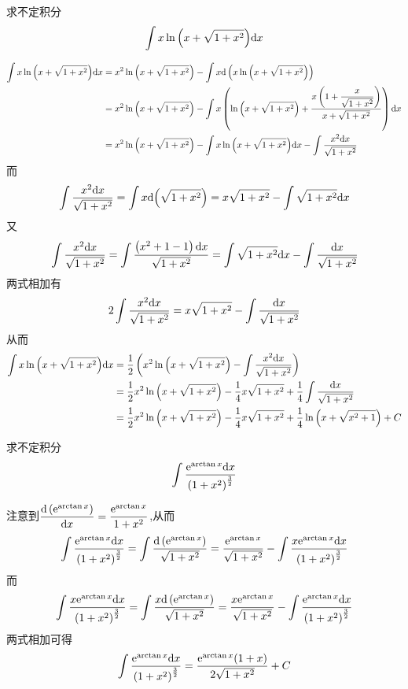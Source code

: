 \documentclass{ctexart}
\begin{document}
\begin{problem}[Problem 5.]
    求不定积分$$\int{x\ln{\left(x+\sqrt{1+x^2}\right)}}\mathrm{d} x$$ 
\end{problem}
\begin{solution}[Solution.]
    $$\begin{aligned}
        \int{x\ln{\left(x+\sqrt{1+x^2}\right)}}\mathrm{d} x
        &= x^2\ln{\left(x+\sqrt{1+x^2}\right)}-\int{x\mathrm{d}\left(x\ln{\left(x+\sqrt{1+x^2}\right)}\right)} \\
        &= x^2\ln{\left(x+\sqrt{1+x^2}\right)}-\int{x\left(\ln{\left(x+\sqrt{1+x^2}\right)}+\dfrac{x\left(1+\dfrac{x}{\sqrt{1+x^2}}\right)}{x+\sqrt{1+x^2}}\right)\mathrm{d}x} \\
        &= x^2\ln{\left(x+\sqrt{1+x^2}\right)}-\int{x\ln{\left(x+\sqrt{1+x^2}\right)}\mathrm{d}x}-\int{\dfrac{x^2\mathrm{d}x}{\sqrt{1+x^2}}}
    \end{aligned}$$
    而$$\int{\dfrac{x^2\mathrm{d}x}{\sqrt{1+x^2}}}=\int{x\mathrm{d}{\left(\sqrt{1+x^2}\right)}}=x\sqrt{1+x^2}-\int{\sqrt{1+x^2}\mathrm{d}x}$$
    又$$\int{\dfrac{x^2\mathrm{d}x}{\sqrt{1+x^2}}}=\int{\dfrac{\left(x^2+1-1\right)\mathrm{d}x}{\sqrt{1+x^2}}}=\int{\sqrt{1+x^2}\mathrm{d}x}-\int{\dfrac{\mathrm{d}x}{\sqrt{1+x^2}}}$$
    两式相加有$$2\int{\dfrac{x^2\mathrm{d}x}{\sqrt{1+x^2}}}=x\sqrt{1+x^2}-\int{\dfrac{\mathrm{d}x}{\sqrt{1+x^2}}}$$
    从而$$\begin{aligned}
        \int{x\ln{\left(x+\sqrt{1+x^2}\right)}}\mathrm{d} x
        &= \dfrac{1}{2}\left(x^2\ln{\left(x+\sqrt{1+x^2}\right)}-\int{\dfrac{x^2\mathrm{d}x}{\sqrt{1+x^2}}}\right) \\
        &= \dfrac{1}{2}x^2\ln{\left(x+\sqrt{1+x^2}\right)}-\dfrac{1}{4}x\sqrt{1+x^2}+\dfrac{1}{4}\int{\dfrac{\mathrm{d}x}{\sqrt{1+x^2}}} \\
        &= \dfrac{1}{2}x^2\ln{\left(x+\sqrt{1+x^2}\right)}-\dfrac{1}{4}x\sqrt{1+x^2}+\dfrac{1}{4}\ln{\left(x+\sqrt{x^2+1}\right)}+C
    \end{aligned}$$
\end{solution}
\begin{problem}[Problem 6.]
    求不定积分$$\int\dfrac{\mathrm{e}^{\arctan{x}}\mathrm{d} x}{\left(1+x^2\right)^\frac{3}{2}}$$
\end{problem}
\begin{solution}
    注意到$\dfrac{\mathrm{d}\left(\mathrm{e}^{\arctan{x}}\right)}{\mathrm{d} x}=\dfrac{\mathrm{e}^{\arctan{x}}}{1+x^2}$,从而
    $$\int\dfrac{\mathrm{e}^{\arctan{x}}\mathrm{d} x}{\left(1+x^2\right)^\frac{3}{2}}
    =\int{\dfrac{\mathrm{d}\left(\mathrm{e}^{\arctan{x}}\right)}{\sqrt{1+x^2}}}
    =\dfrac{\mathrm{e}^{\arctan{x}}}{\sqrt{1+x^2}}-\int{\dfrac{x\mathrm{e}^{\arctan{x}}\mathrm{d}x}{\left(1+x^2\right)^\frac{3}{2}}}$$
    而
    $$\int{\dfrac{x\mathrm{e}^{\arctan{x}}\mathrm{d}x}{\left(1+x^2\right)^\frac{3}{2}}}
    =\int{\dfrac{x\mathrm{d}\left(\mathrm{e}^{\arctan{x}}\right)}{\sqrt{1+x^2}}}
    =\dfrac{x\mathrm{e}^{\arctan{x}}}{\sqrt{1+x^2}}-\int{\dfrac{\mathrm{e}^{\arctan{x}}\mathrm{d}x}{\left(1+x^2\right)^\frac{3}{2}}}$$
    两式相加可得
    $$\int\dfrac{\mathrm{e}^{\arctan{x}}\mathrm{d} x}{\left(1+x^2\right)^\frac{3}{2}}
    =\dfrac{\mathrm{e}^{\arctan{x}}(1+x)}{2\sqrt{1+x^2}}+C$$
\end{solution}
\end{document}
